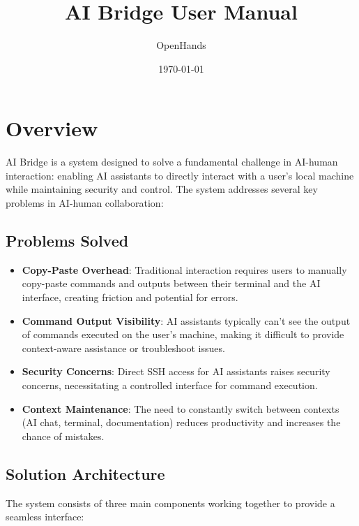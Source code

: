 \documentclass{article}
\title{AI Bridge User Manual}
\author{OpenHands}
\date{\today}
\begin{document}
\maketitle

\section{Overview}
AI Bridge is a system designed to solve a fundamental challenge in AI-human interaction: enabling AI assistants to directly interact with a user's local machine while maintaining security and control. The system addresses several key problems in AI-human collaboration:

\subsection{Problems Solved}
\begin{itemize}
    \item \textbf{Copy-Paste Overhead}: Traditional interaction requires users to manually copy-paste commands and outputs between their terminal and the AI interface, creating friction and potential for errors.
    
    \item \textbf{Command Output Visibility}: AI assistants typically can't see the output of commands executed on the user's machine, making it difficult to provide context-aware assistance or troubleshoot issues.
    
    \item \textbf{Security Concerns}: Direct SSH access for AI assistants raises security concerns, necessitating a controlled interface for command execution.
    
    \item \textbf{Context Maintenance}: The need to constantly switch between contexts (AI chat, terminal, documentation) reduces productivity and increases the chance of mistakes.
\end{itemize}

\subsection{Solution Architecture}
The system consists of three main components working together to provide a seamless interface:
\end{document}
